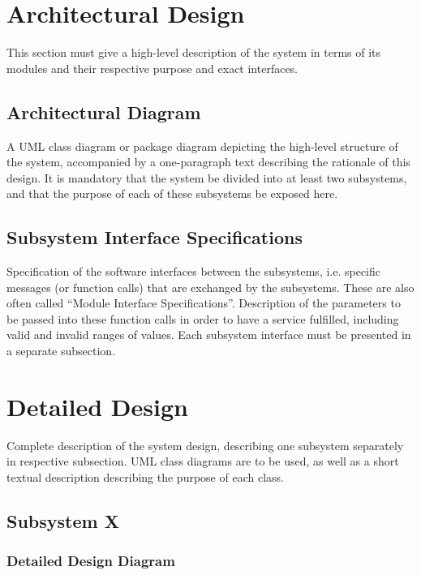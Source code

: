 \documentclass[12pt]{article}
\begin{document}
\section{Architectural Design} \label{sec:arch}

This section must give a high-level description of the system in terms of its modules
and their respective purpose and exact interfaces.

\subsection{Architectural Diagram}

A UML class diagram or package diagram depicting the high-level structure of the system,
accompanied by a one-paragraph text describing the rationale of this design.
It is mandatory that the system be divided into at least two subsystems,
and that the purpose of each of these subsystems be exposed here.

\subsection{Subsystem Interface Specifications}

Specification of the software interfaces between the subsystems,
i.e. specific messages (or function calls) that are exchanged by the subsystems.
These are also often called ``Module Interface Specifications''.
Description of the parameters to be passed into these function calls in order to have a service fulfilled,
including valid and invalid ranges of values.
Each subsystem interface must be presented in a separate subsection.

\section{Detailed Design} \label{sec:detail}

Complete description of the system design, describing one subsystem separately in respective subsection.
UML class diagrams are to be used, as well as a short textual description describing the purpose of each class.

\subsection{Subsystem X}

\subsubsection{Detailed Design Diagram}
\end{document}
